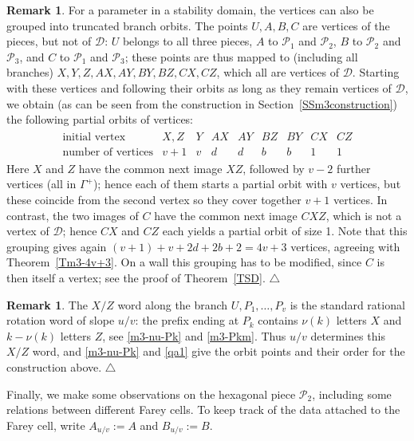 \documentclass[11pt,reqno,tbtags,a4paper]{amsart}
\numberwithin{equation}{section}
\theoremstyle{plain}%
\theoremstyle{definition}
\newcommand\xqed[1]{%
    \leavevmode\unskip\penalty9999 \hbox{}\nobreak\hfill
    \quad\hbox{#1}}
\newtheorem{remarkqqq}[theorem]{Remark}
\newenvironment{remark}{\begin{remarkqqq}}
  {\xqed{$\triangle$}\end{remarkqqq}}
\theoremstyle{remark}
\newcommand{\refT}[1]{Theorem~\ref{#1}}
\newcommand{\refSS}[1]{Section~\ref{#1}}
\newcounter{cc}
\newcommand\gG{\Gamma}
\newcommand\cD{\mathcal D}
\newcommand\cP{\mathcal P}
\newcommand\0{{\boldsymbol 0}}
\newcommand\1{{\boldsymbol 1}}
\begin{document}
\begin{remark}\label{Rm3-vertex-orbits}
For a parameter in a stability domain, the vertices can also be grouped into
truncated branch orbits.  The points
$U,A,B,C$ are vertices of the pieces, but not of $\cD$: $U$ belongs to all
three pieces, $A$ to $\cP_1$ and $\cP_2$, $B$ to $\cP_2$ and $\cP_3$, and
$C$ to $\cP_1$ and $\cP_3$; 
these points are thus mapped to (including all branches)
$X,Y,Z,AX,AY,BY,BZ,CX,CZ$, which all are vertices of $\cD$.
Starting with these vertices and following their orbits
as long as they remain vertices of $\cD$, we obtain
(as can be seen from the construction in \refSS{SSm3construction})
the following partial orbits of vertices:
\begin{align}
\begin{array}{c|cccccccc}
\text{initial vertex}&X,Z&Y&AX&AY&BZ&BY&CX&CZ\\ \hline
\text{number of vertices}&v+1&v&d&d&b&b&1&1
\end{array}
\end{align}
Here $X$ and $Z$ have the common next image $XZ$, 
followed by $v-2$ further vertices (all in $\gG^+$);
hence each of them starts a partial orbit with $v$ vertices, but these coincide
from the second vertex so they cover together $v+1$ vertices.
In contrast, the
two images of $C$ have the common next image $CXZ$, which is not a vertex of
$\cD$; hence $CX$ and $CZ$ each yields a partial orbit of size 1.  
Note that this grouping gives again
$(v+1)+v+2d+2b+2=4v+3$ vertices, agreeing with \refT{Tm3-4v+3}.
On a wall this grouping has to be modified,
since $C$ is then itself a vertex; see the proof of \refT{TSD}.
\end{remark}

\begin{remark}\label{Rword}
The $X/Z$ word along the branch
$U,P_1,\dots,P_v$ is the standard rational rotation word of slope $u/v$:
the prefix ending at $P_k$ contains $\nu(k)$ letters $X$ and
$k-\nu(k)$ letters $Z$,
see \eqref{m3-nu-Pk} and \eqref{m3-Pkm}.  
Thus $u/v$ determines this $X/Z$ word, 
and \eqref{m3-nu-Pk} and \eqref{qa1}
give the orbit points and their order for the construction above.
\end{remark}

Finally, we make some observations on the  hexagonal piece $\cP_2$,
including some relations between different Farey cells.
To keep track of the data attached to the Farey cell, write
$A_{u/v}:=A$ and $B_{u/v}:=B$.
\end{document}
